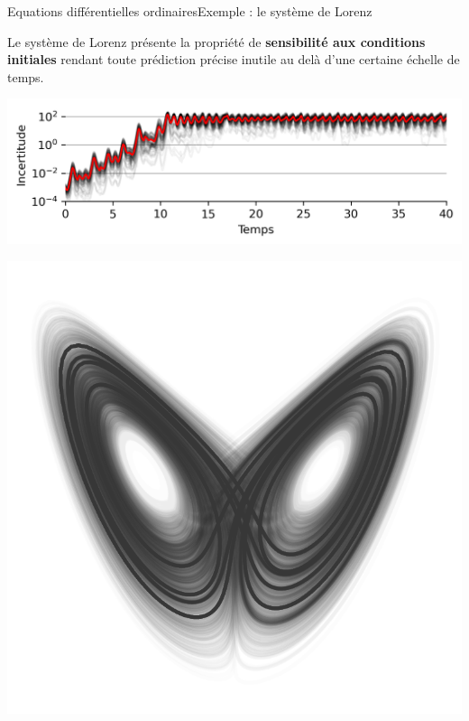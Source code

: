 \documentclass[usenames,dvipsnames,svgnames,10pt,aspectratio=169]{beamer}
\begin{document}
\begin{frame}[t, c]{Equations différentielles ordinaires}{Exemple : le système de Lorenz}
  \begin{minipage}{.68\textwidth}

    Le système de Lorenz présente la propriété de \alert{\textbf{sensibilité aux conditions initiales}} rendant toute prédiction précise inutile au delà d'une certaine échelle de temps.

    \bigskip

    \begin{center}
      \includegraphics[width=\textwidth]{lorenz_forecast_error}
    \end{center}
  \end{minipage}%
  \hfill
  \begin{minipage}{.28\textwidth}
    \centering
    \includegraphics[width=\textwidth]{lorenz_attractor}
  \end{minipage}
\end{frame}
\end{document}
